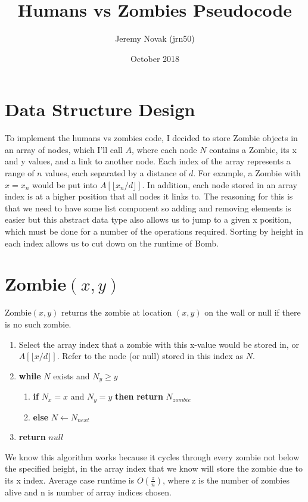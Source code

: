 \documentclass{article}
\title{Humans vs Zombies Pseudocode}
\author{Jeremy Novak (jrn50) }
\date{October 2018}
\begin{document}
\maketitle
\section{Data Structure Design}
To implement the humans vs zombies code, I decided to store Zombie objects in an array of nodes, which I'll call $A$, where each node $N$ contains a Zombie, its x and y values, and a link to another node. Each index of the array represents a range of $n$ values, each separated by a distance of $d$. For example, a Zombie with $x = x_n$ would be put into $A[\lfloor x_n/d \rfloor]$. In addition, each node stored in an array index is at a higher position that all nodes it links to. The reasoning for this is that we need to have some list component so adding and removing elements is easier but this abstract data type also allows us to jump to a given x position, which must be done for a number of the operations required. Sorting by height in each index allows us to cut down on the runtime of Bomb.

\section{Zombie$(x,y)$}
Zombie$(x,y)$  returns  the  zombie  at  location  $(x, y)$  on  the  wall or null if there is no such zombie.
\begin{enumerate}
    \item Select the array index that a zombie with this x-value would be stored in, or $A[\lfloor x/d \rfloor]$. Refer to the node (or null) stored in this index as $N$.
    \item \textbf{while} $N$ exists and $N_y\geq y$
    \begin{enumerate}
        \item \textbf{if} $N_x = x$ and $N_y = y$ \textbf{then} \textbf{return} $N_{zombie}$
        \item \textbf{else} $N \leftarrow N_{next}$
    \end{enumerate}
    \item \textbf{return} $null$
\end{enumerate}
We know this algorithm works because it cycles through every zombie not below the specified height, in the array index that we know will store the zombie due to its x index. Average case runtime is $O(\frac{z}{n})$, where z is the number of zombies alive and n is number of array indices chosen.
\end{document}
